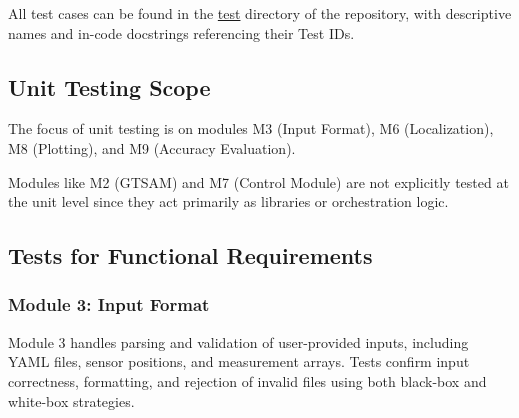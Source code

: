 \documentclass[12pt, titlepage]{article}
\begin{document}
All test cases can be found in the \hyperlink{https://github.com/AliyahJimoh/2D-Localizer/tree/main/test}{test} directory of the repository, with descriptive names and in-code docstrings referencing their Test IDs.

\subsection{Unit Testing Scope}


The focus of unit testing is on modules M3 (Input Format), M6 (Localization), M8 (Plotting), and M9 (Accuracy Evaluation).

Modules like M2 (GTSAM) and M7 (Control Module) are not explicitly tested at the unit level since they act primarily as libraries or orchestration logic.

\subsection{Tests for Functional Requirements}


\subsubsection{Module 3: Input Format}

Module 3 handles parsing and validation of user-provided inputs, including YAML files, sensor positions, and measurement arrays. Tests confirm input correctness, formatting, and rejection of invalid files using both black-box and white-box strategies.
\end{document}
